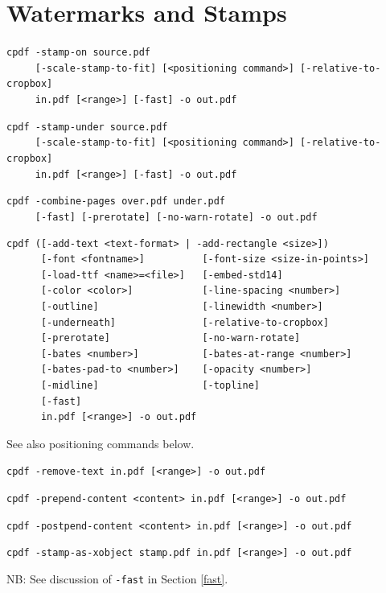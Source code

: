 \documentclass{book}
\begin{document}
\chapter{Watermarks and Stamps}\label{chap:8}
\label{stamps}
  \begin{framed}
  \noindent\small\verb!cpdf -stamp-on source.pdf!\\
  \noindent\small\verb!     [-scale-stamp-to-fit] [<positioning command>] [-relative-to-cropbox] !\\
  \noindent\small\verb!     in.pdf [<range>] [-fast] -o out.pdf!
  
  \vspace{1.5mm}
  \noindent\small\verb!cpdf -stamp-under source.pdf!\\
  \noindent\small\verb!     [-scale-stamp-to-fit] [<positioning command>] [-relative-to-cropbox]!\\
  \noindent\small\verb!     in.pdf [<range>] [-fast] -o out.pdf!

  \vspace{1.5mm}
  \noindent\small\verb!cpdf -combine-pages over.pdf under.pdf!\\
  \noindent\small\verb!     [-fast] [-prerotate] [-no-warn-rotate] -o out.pdf!

  \vspace{1.5mm}
  \noindent\small\begin{verbatim}cpdf ([-add-text <text-format> | -add-rectangle <size>])
      [-font <fontname>]          [-font-size <size-in-points>]
      [-load-ttf <name>=<file>]   [-embed-std14]
      [-color <color>]            [-line-spacing <number>]
      [-outline]                  [-linewidth <number>]
      [-underneath]               [-relative-to-cropbox]
      [-prerotate]                [-no-warn-rotate]
      [-bates <number>]           [-bates-at-range <number>]
      [-bates-pad-to <number>]    [-opacity <number>]
      [-midline]                  [-topline]
      [-fast]
      in.pdf [<range>] -o out.pdf\end{verbatim}

  \vspace{1.5mm}
  \noindent See also positioning commands below.

  \vspace{1.5mm}
  \noindent\small\verb!cpdf -remove-text in.pdf [<range>] -o out.pdf!

  \vspace{1.5mm}
  \noindent\small\verb!cpdf -prepend-content <content> in.pdf [<range>] -o out.pdf!

  \vspace{1.5mm}
  \noindent\small\verb!cpdf -postpend-content <content> in.pdf [<range>] -o out.pdf!

  \vspace{1.5mm}
  \noindent\small\verb!cpdf -stamp-as-xobject stamp.pdf in.pdf [<range>] -o out.pdf!

  \vspace{1.5mm}
  \noindent\small NB: See discussion of \texttt{-fast} in Section \ref{fast}.
  \end{framed}
\end{document}
